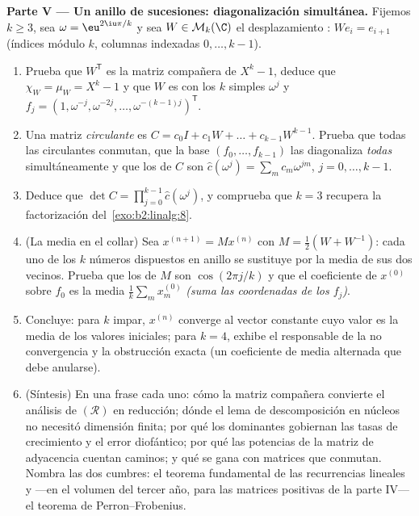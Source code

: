 \begin{problem}
\medskip
\noindent\textbf{Parte V --- Un anillo de sucesiones:
diagonalización simultánea.} Fijemos $k \geq 3$, sea $\omega =
\eu^{2\iu\pi/k}$ y sea $W \in \mathcal{M}_k(\C)$ el desplazamiento
: $W e_i = e_{i+1}$ (índices módulo $k$, columnas indexadas
$0, \dots, k-1$).
\begin{enumerate}[resume]
  \item Prueba que $W^{\mathsf T}$ es la matriz compañera de $X^k -
        1$, deduce que $\chi_W = \mu_W = X^k - 1$ y que $W$ es
         con los $k$  simples
        $\omega^j$ y  $f_j = (1, \omega^{-j},
        \omega^{-2j}, \dots, \omega^{-(k-1)j})^{\mathsf T}$.
  \item Una matriz \emph{circulante} es $C = c_0 I + c_1 W + \dots
        + c_{k-1}W^{k-1}$. Prueba que todas las circulantes
        conmutan, que la base $(f_0, \dots, f_{k-1})$ las
        diagonaliza \emph{todas} simultáneamente y que los
         de $C$ son $\widehat c(\omega^j) = \sum_m
        c_m \omega^{jm}$, $j = 0, \dots, k-1$.
  \item Deduce que $\det C = \prod_{j=0}^{k-1} \widehat
        c(\omega^j)$, y comprueba que $k = 3$ recupera la
        factorización del~\cref{exo:b2:linalg:8}.
  \item (La media en el collar) Sea $x^{(n+1)} = Mx^{(n)}$ con $M =
        \frac12(W + W^{-1})$: cada uno de los $k$ números
        dispuestos en anillo se sustituye por la media de sus dos
        vecinos. Prueba que los  de $M$ son
        $\cos(2\pi j/k)$ y que el coeficiente de $x^{(0)}$ sobre
        $f_0$ es la media $\frac1k\sum_m x^{(0)}_m$ \emph{(suma las
        coordenadas de los $f_j$)}.
  \item Concluye: para $k$ impar, $x^{(n)}$ converge al vector
        constante cuyo valor es la media de los valores iniciales;
        para $k = 4$, exhibe el  responsable de la no
        convergencia y la obstrucción exacta (un coeficiente de
        media alternada que debe anularse).
  \item (Síntesis) En una frase cada uno: cómo la matriz compañera
        convierte el análisis de $(\mathcal R)$ en reducción; dónde
        el lema de descomposición en núcleos no necesitó dimensión
        finita; por qué los  dominantes gobiernan las
        tasas de crecimiento y el error diofántico; por qué las
        potencias de la matriz de adyacencia cuentan caminos; y qué
        se gana con matrices que conmutan. Nombra las dos cumbres:
        el teorema fundamental de las recurrencias lineales y ---en
        el volumen del tercer año, para las matrices positivas de
        la parte IV--- el teorema de Perron--Frobenius.
\end{enumerate}
\end{problem}
